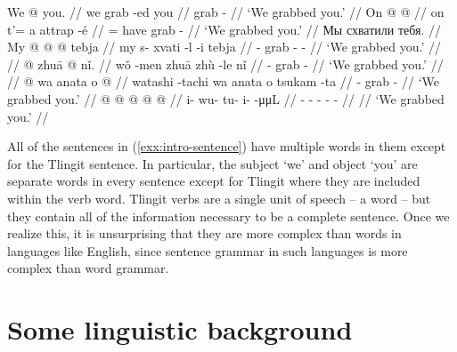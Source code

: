 \pex\label{exx:intro-sentence}%
\a\label{ex:intro-sentence-english}%
%
\begingl
	\gla	We  @ {} you. //
	\glb	we grab -ed you //
	\glc	{} grab -  //
	\glft	‘We grabbed you.’
		//
\endgl
\a\label{ex:intro-sentence-french}%
%
\begingl
	\gla	On  @ {}  @ {} //
	\glb	on t’= a  attrap -é //
	\glc	{} = have grab - //
	\glft	‘We grabbed you.’
		//
\endgl
\a\label{ex:intro-sentence-russian}%
%
\begingl
	\glpreamble	Мы схватили тебя. //
	\gla	My  @ {} @ {} @ {} tebja //
	\glb	my s- xvati -l -i tebja //
	\glc	{} - grab - -  //
	\glft	‘We grabbed you.’
		//
\endgl
\a\label{ex:intro-sentence-mandarin}%
%
\begingl
	 //
	\gla	{} @ {} zhuā  @ {} nǐ. //
	\glb	wǒ -men zhuā zhù -le nǐ //
	\glc	{} - grab  -  //
	\glft	‘We grabbed you.’
		//
\endgl
\a\label{ex:intro-sentence-japanese}%
%
\begingl
	 //
	\gla	{} @ {} wa anata o  @ {} //
	\glb	watashi -tachi wa anata o tsukam -ta //
	\glc	{} -    grab - //
	\glft	‘We grabbed you.’
		//
\endgl
\a\label{ex:intro-sentence-tlingit}%
%
\begingl
	\gla	{} @ {} @ {} @ {} @ {} @ {} //
	\glb	i- wu- tu- i-  -μμL //
	\glc	{}- - - -  - //
	\gld	{} {} {} {} {} {} //
	\glft	‘We grabbed you.’
		//
\endgl
\xe

All of the sentences in (\ref{exx:intro-sentence}) have multiple words in them except for the Tlingit sentence.
In particular, the subject ‘we’ and object ‘you’ are separate words in every sentence except for Tlingit where they are included within the verb word.
Tlingit verbs are a single unit of speech – a word – but they contain all of the information necessary to be a complete sentence.
Once we realize this, it is unsurprising that they are more complex than words in languages like English, since sentence grammar in such languages is more complex than word grammar.

\section{Some linguistic background}\label{sec:intro-ling}

